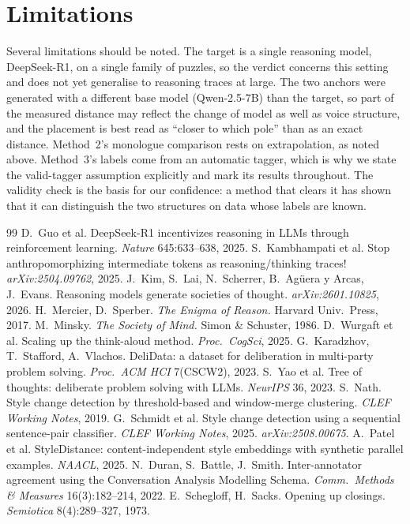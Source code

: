 \documentclass[10pt,twocolumn]{article}
\begin{document}
\section{Limitations}
Several limitations should be noted. The target is a single reasoning model, DeepSeek-R1, on a single
family of puzzles, so the verdict concerns this setting and does not yet generalise to reasoning
traces at large. The two anchors were generated with a different base model (Qwen-2.5-7B) than the
target, so part of the measured distance may reflect the change of model as well as voice structure,
and the placement is best read as ``closer to which pole'' than as an exact distance. Method~2's
monologue comparison rests on extrapolation, as noted above. Method~3's labels come from an automatic
tagger, which is why we state the valid-tagger assumption explicitly and mark its results throughout.
The validity check is the basis for our confidence: a method that clears it has shown that it can
distinguish the two structures on data whose labels are known.

\begin{thebibliography}{99}
\small
\setlength{\itemsep}{0.6pt}\setlength{\parskip}{0pt}
 D.\ Guo et al. DeepSeek-R1 incentivizes reasoning in LLMs through reinforcement
learning. \textit{Nature} 645:633--638, 2025.
 S.\ Kambhampati et al. Stop anthropomorphizing intermediate tokens as
reasoning/thinking traces! \textit{arXiv:2504.09762}, 2025.
 J.\ Kim, S.\ Lai, N.\ Scherrer, B.\ Ag\"uera y Arcas, J.\ Evans. Reasoning models
generate societies of thought. \textit{arXiv:2601.10825}, 2026.
 H.\ Mercier, D.\ Sperber. \textit{The Enigma of Reason.} Harvard Univ.\
Press, 2017.
 M.\ Minsky. \textit{The Society of Mind.} Simon \& Schuster, 1986.
\bibitem{wurgaft2025} D.\ Wurgaft et al. Scaling up the think-aloud method. \textit{Proc.\ CogSci},
2025.
 G.\ Karadzhov, T.\ Stafford, A.\ Vlachos. DeliData: a dataset for
deliberation in multi-party problem solving. \textit{Proc.\ ACM HCI} 7(CSCW2), 2023.
\bibitem{yao2023} S.\ Yao et al. Tree of thoughts: deliberate problem solving with LLMs.
\textit{NeurIPS} 36, 2023.
 S.\ Nath. Style change detection by threshold-based and window-merge clustering.
\textit{CLEF Working Notes}, 2019.
 G.\ Schmidt et al. Style change detection using a sequential sentence-pair
classifier. \textit{CLEF Working Notes}, 2025. \textit{arXiv:2508.00675}.
\bibitem{patel2025} A.\ Patel et al. StyleDistance: content-independent style embeddings with
synthetic parallel examples. \textit{NAACL}, 2025.
 N.\ Duran, S.\ Battle, J.\ Smith. Inter-annotator agreement using the
Conversation Analysis Modelling Schema. \textit{Comm.\ Methods \& Measures} 16(3):182--214, 2022.
\bibitem{schegloff1973} E.\ Schegloff, H.\ Sacks. Opening up closings. \textit{Semiotica}
8(4):289--327, 1973.
\end{thebibliography}
\end{document}
